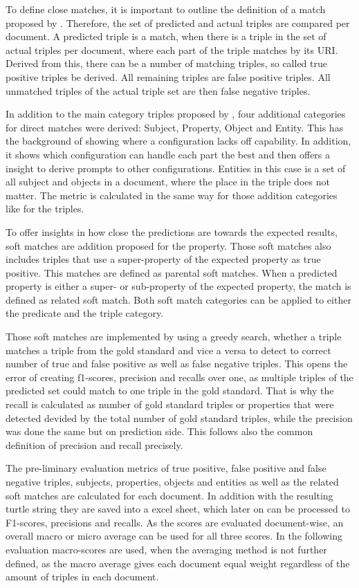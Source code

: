 \documentclass[a4paper,oneside,bibliography=totoc]{scrbook}
\begin{document}
To define close matches, it is important to outline the definition of a match proposed by \citet{Josifoski2021}. Therefore, the set of predicted and actual triples are compared per document. A predicted triple is a match, when there is a triple in the set of actual triples per document, where each part of the triple matches by its \ac{URI}. Derived from this, there can be a number of matching triples, so called true positive triples be derived. All remaining triples are false positive triples. All unmatched triples of the actual triple set are then false negative triples.

In addition to the main category triples proposed by \citet{Josifoski2021}, four additional categories for direct matches were derived: Subject, Property, Object and Entity. This has the background of showing where a configuration lacks off capability. In addition, it shows which configuration can handle each part the best and then offers a insight to derive prompts to other configurations. Entities in this case is a set of all subject and objects in a document, where the place in the triple does not matter. The metric is calculated in the same way for those addition categories like for the triples.

To offer insights in how close the predictions are towards the expected results, soft matches are addition proposed for the property. Those soft matches also includes triples that use a super-property of the expected property as true positive. This matches are defined as parental soft matches. When a predicted property is either a super- or sub-property of the expected property, the match is defined as related soft match. Both soft match categories can be applied to either the predicate and the triple category.

Those soft matches are implemented by using a greedy search, whether a triple matches a triple from the gold standard and vice a versa to detect to correct number of true and false positive as well as false negative triples. This opens the error of creating f1-scores, precision and recalls over one, as multiple triples of the predicted set could match to one triple in the gold standard. That is why the recall is calculated as number of gold standard triples or properties that were detected devided by the total number of gold standard triples, while the precision was done the same but on prediction side. This follows also the common definition of precision and recall precisely.

The pre-liminary evaluation metrics of true positive, false positive and false negative triples, subjects, properties, objects and entities as well as the related soft matches are calculated for each document. In addition with the resulting turtle string they are saved into a excel sheet, which later on can be processed to F1-scores, precisions and recalls. As the scores are evaluated document-wise, an overall macro or micro average can be used for all three scores. In the following evaluation macro-scores are used, when the averaging method is not further defined, as the macro average gives each document equal weight regardless of the amount of triples in each document.
\end{document}
